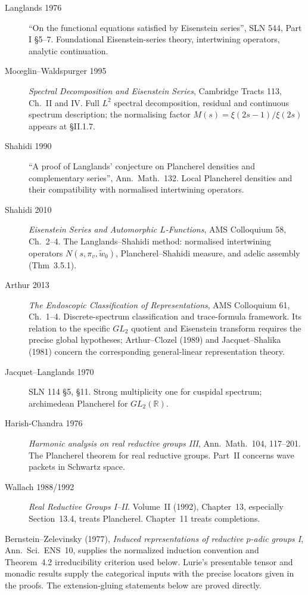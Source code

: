 \begin{description}
\item[Langlands 1976] ``On the functional equations satisfied by
Eisenstein series'', SLN 544, Part I \S 5--7. Foundational
Eisenstein-series theory, intertwining operators, analytic
continuation.
\item[Mo{\oe}glin--Waldspurger 1995] \emph{Spectral Decomposition and
Eisenstein Series}, Cambridge Tracts 113, Ch.~II and IV. Full
\(L^{2}\) spectral decomposition, residual and continuous spectrum
description; the normalising factor \(M(s)=\xi(2s-1)/\xi(2s)\)
appears at \S II.1.7.
\item[Shahidi 1990] ``A proof of Langlands' conjecture on Plancherel
densities and complementary series'', Ann.\ Math.\ 132. Local
Plancherel densities and their compatibility with normalised
intertwining operators.
\item[Shahidi 2010] \emph{Eisenstein Series and Automorphic
\(L\)-Functions}, AMS Colloquium 58, Ch.~2--4. The
Langlands--Shahidi method: normalised intertwining operators
\(N(s,\pi_{v},\tilde w_{0})\), Plancherel--Shahidi measure, and
adelic assembly (Thm~3.5.1).
\item[Arthur 2013] \emph{The Endoscopic Classification of
Representations}, AMS Colloquium 61, Ch.~1--4. Discrete-spectrum
classification and trace-formula framework. Its relation to the
specific $GL_2$ quotient and Eisenstein transform requires the precise
global hypotheses; Arthur--Clozel (1989) and Jacquet--Shalika (1981)
concern the corresponding general-linear representation theory.
\item[Jacquet--Langlands 1970] SLN 114 \S 5, \S 11. Strong
multiplicity one for cuspidal spectrum; archimedean Plancherel
for \(GL_{2}(\mathbb{R})\).
\item[Harish-Chandra 1976]
\emph{Harmonic analysis on real reductive groups III}, Ann.\ Math.~104,
117--201. The Plancherel theorem for real reductive groups.
Part~II concerns wave packets in Schwartz space.
\item[Wallach 1988/1992]
\emph{Real Reductive Groups I--II}. Volume~II (1992), Chapter~13,
especially Section~13.4, treats Plancherel. Chapter~11 treats completions.
\end{description}

Bernstein--Zelevinsky (1977), \emph{Induced representations of
reductive $p$-adic groups I}, Ann.\ Sci.\ ENS~10, supplies the
normalized induction convention and Theorem~4.2 irreducibility
criterion used below. Lurie's presentable tensor and monadic results
supply the categorical inputs with the precise locators given in the
proofs. The extension-gluing statements below are proved directly.

